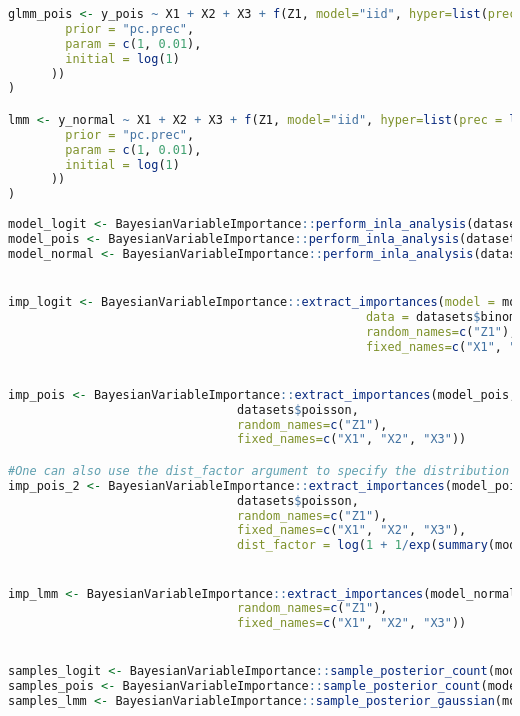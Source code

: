 \begin{lstlisting}[language=R, caption=Usage of the BayesianImpGLMM package with plots and examples.]
glmm_pois <- y_pois ~ X1 + X2 + X3 + f(Z1, model="iid", hyper=list(prec = list(
        prior = "pc.prec",
        param = c(1, 0.01),
        initial = log(1)
      ))
)

lmm <- y_normal ~ X1 + X2 + X3 + f(Z1, model="iid", hyper=list(prec = list(
        prior = "pc.prec",
        param = c(1, 0.01),
        initial = log(1)
      ))
)
    
model_logit <- BayesianVariableImportance::perform_inla_analysis(datasets$binomial_logit, glmm_logit, family = "binomial", link_func = "logit")
model_pois <- BayesianVariableImportance::perform_inla_analysis(datasets$poisson, glmm_pois, family = "poisson", link_func = "log")
model_normal <- BayesianVariableImportance::perform_inla_analysis(datasets$normal, lmm, family = "gaussian", link_func = "identity")


imp_logit <- BayesianVariableImportance::extract_importances(model = model_logit, 
                                                  data = datasets$binomial_logit,
                                                  random_names=c("Z1"), 
                                                  fixed_names=c("X1", "X2", "X3"))


imp_pois <- BayesianVariableImportance::extract_importances(model_pois, 
                                datasets$poisson,
                                random_names=c("Z1"), 
                                fixed_names=c("X1", "X2", "X3"))

#One can also use the dist_factor argument to specify the distribution factor one wishes to use
imp_pois_2 <- BayesianVariableImportance::extract_importances(model_pois, 
                                datasets$poisson,
                                random_names=c("Z1"), 
                                fixed_names=c("X1", "X2", "X3"),
                                dist_factor = log(1 + 1/exp(summary(model_pois)$fixed[1] + 0.5)))


imp_lmm <- BayesianVariableImportance::extract_importances(model_normal, datasets$normal,
                                random_names=c("Z1"), 
                                fixed_names=c("X1", "X2", "X3"))


samples_logit <- BayesianVariableImportance::sample_posterior_count(model_logit, glmm_logit, datasets$binomial_logit, n_samp=5000, additive_param = "Z1")
samples_pois <- BayesianVariableImportance::sample_posterior_count(model_pois, glmm_pois, datasets$poisson, n_samp=5000, additive_param = "Z1")
samples_lmm <- BayesianVariableImportance::sample_posterior_gaussian(model_normal, lmm, datasets$normal, n_samp=5000, additive_param = "Z1")


\end{lstlisting}
